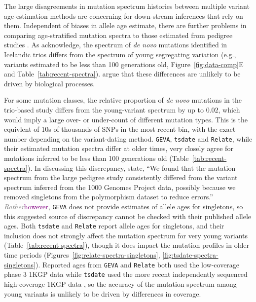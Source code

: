 \documentclass[]{article}
\newcommand{\krtcomment}[1]{{\textcolor{purple}{KRT: #1}}}
\newcommand{\krtedit}[2]{{\emph{\textcolor{gray}{#1}}}{\textcolor{purple}{#2}}}
\newcommand{\GEVA}{\texttt{GEVA}\xspace}
\newcommand{\tsdate}{\texttt{tsdate}\xspace}
\newcommand{\relate}{\texttt{Relate}\xspace}
\begin{document}
The large disagreements in mutation spectrum histories between multiple variant
age-estimation methods are concerning for down-stream inferences that rely on
them. Independent of biases in allele age estimate, there are further problems
in comparing age-stratified mutation spectra to those estimated from pedigree
studies \citep{jonsson2017parental,halldorsson2019characterizing}. As
\citet{wang2023human} acknowledge, the spectrum of \emph{de novo} mutations
identified in Icelandic trios \citep{jonsson2017parental} differs from the
spectrum of young segregating variation (e.g., variants estimated to be less
than 100 generations old, Figure~\ref{fig:data-comp}E and
Table~\ref{tab:recent-spectra}). \citet{gao2022limited} argue that these
differences are unlikely to be driven by biological processes.

For some mutation classes, the relative proportion of \emph{de novo} mutations
in the trio-based study differs from the young-variant spectrum by up to
$0.02$, which would imply a large over- or under-count of different mutation
types. This is the equivlent of 10s of thousands of SNPs in the most recent
bin, with the exact number depending on the variant-dating method.
\GEVA, \tsdate and \relate, while their estimated mutation spectra differ at
older times, very closely agree for mutations inferred to be less than 100
generations old (Table~\ref{tab:recent-spectra}). In discussing this
discrepancy, \citet{wang2023human} state, ``We found that the mutation spectrum
from the large pedigree study consistently differed from the variant spectrum
inferred from the 1000 Genomes Project data, possibly because we removed
singletons from the polymorphism dataset to reduce errors.'' \krtedit{Rather}{however}, \GEVA does
not provide estimates of allele ages for singletons, so this suggested source
of discrepancy cannot be checked with their published allele ages. Both \tsdate
and \relate report allele ages for singletons, and their inclusion does not
strongly affect the mutation spectrum for very young variants
(Table~\ref{tab:recent-spectra}), though it does impact the mutation profiles
in older time periods (Figures~\ref{fig:relate-spectra-singletons},
\ref{fig:tsdate-spectra-singletons}). Reported ages from \GEVA and \relate both
used the low-coverage phase 3 1KGP data while \tsdate used the more recent
independently sequenced high-coverage 1KGP data \citep{byrska2022high}, so the
accuracy of the mutation spectrum among young variants is unlikely to be driven
by differences in coverage.
\end{document}
